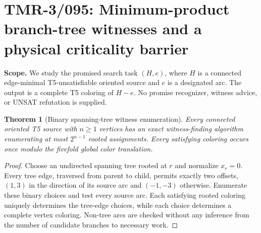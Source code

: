 \documentclass[11pt]{article}
\newtheorem{theorem}{Theorem}
\begin{document}
\section{TMR-3/095: Minimum-product branch-tree witnesses and a physical criticality barrier}
\textbf{Scope.} We study the promised search task $(H,e)$, where $H$ is a
connected edge-minimal T5-unsatisfiable oriented source and $e$ is a
designated arc. The output is a complete T5 coloring of $H-e$.
No promise recognizer, witness advice, or UNSAT refutation is supplied.

\begin{theorem}[Binary spanning-tree witness enumeration]
Every connected oriented T5 source with $n\geq1$ vertices has an exact
witness-finding algorithm enumerating at most $2^{n-1}$ rooted
assignments. Every satisfying coloring occurs once modulo the fivefold
global color translation.
\end{theorem}
\begin{proof}
Choose an undirected spanning tree rooted at $r$ and normalize
$x_r=0$. Every tree edge, traversed from parent to child, permits
exactly two offsets, $(1,3)$ in the direction of its source arc and
$(-1,-3)$ otherwise. Enumerate these binary choices and test every
source arc. Each satisfying rooted coloring uniquely determines the
tree-edge choices, while each choice determines a complete vertex
coloring. Non-tree arcs are checked without any inference from the
number of candidate branches to necessary work.
\end{proof}
\end{document}
